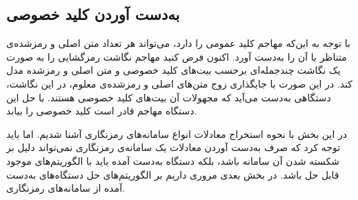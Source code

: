 \subsection{به‌دست آوردن کلید خصوصی}
با توجه به این‌که مهاجم کلید عمومی را دارد، می‌تواند هر تعداد متن اصلی و رمزشده‌ی متناظر با آن را به‌دست آورد. اکنون فرض کنید مهاجم نگاشت رمزگشایی را به صورت یک نگاشت چندجمله‌ای برحسب بیت‌های کلید خصوصی و متن اصلی و رمزشده مدل کند. در این صورت با جایگذاری زوج متن‌های اصلی و رمزشده‌ی معلوم، در این نگاشت، دستگاهی به‌دست می‌آید که مجهولات آن بیت‌های کلید خصوصی هستند. با حل این دستگاه مهاجم قادر است کلید خصوصی را بیابد.

 
 در این بخش با نحوه‌  استخراج معادلات انواع سامانه‌های رمزنگاری آشنا شدیم. اما باید توجه کرد که صرف به‌دست آوردن معادلات یک سامانه‌ی رمزنگاری نمی‌تواند دلیل بر شکسته شدن آن سامانه باشد، بلکه  دستگاه به‌دست آمده باید با الگوریتم‌های موجود قابل حل باشد. در بخش بعدی مروری داریم بر الگوریتم‌های حل دستگاه‌های به‌دست آمده از سامانه‌های رمزنگاری. 
 
 



